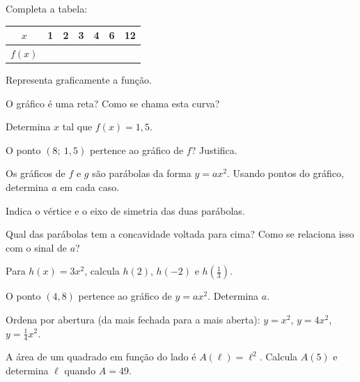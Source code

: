 \documentclass[12pt]{article}
\begin{document}
\begin{exercicios}
  \item Completa a tabela: \begin{tabular}[c]{|c|c|c|c|c|c|c|}\hline
    $x$ & 1 & 2 & 3 & 4 & 6 & 12 \\\hline
    $f(x)$ & & & & & & \\\hline
  \end{tabular}
  \item Representa graficamente a função.
  \item O gráfico é uma reta? Como se chama esta curva?
  \item Determina $x$ tal que $f(x) = 1{,}5$.
  \item O ponto $(8;\ 1{,}5)$ pertence ao gráfico de $f$? Justifica.
\end{exercicios}


\begin{center}
\end{center}

\begin{exercicios}
  \item Os gráficos de $f$ e $g$ são parábolas da forma $y = ax^2$. Usando pontos do gráfico, determina $a$ em cada caso.
  \item Indica o vértice e o eixo de simetria das duas parábolas.
  \item Qual das parábolas tem a concavidade voltada para cima? Como se relaciona isso com o sinal de $a$?
  \item Para $h(x) = 3x^2$, calcula $h(2)$, $h(-2)$ e $h(\tfrac{1}{3})$.
  \item O ponto $(4, 8)$ pertence ao gráfico de $y = ax^2$. Determina $a$.
  \item Ordena por abertura (da mais fechada para a mais aberta): $y = x^2$, $y = 4x^2$, $y = \tfrac{1}{4}x^2$.
  \item A área de um quadrado em função do lado é $A(\ell) = \ell^2$. Calcula $A(5)$ e determina $\ell$ quando $A = 49$.
\end{exercicios}
\end{document}
